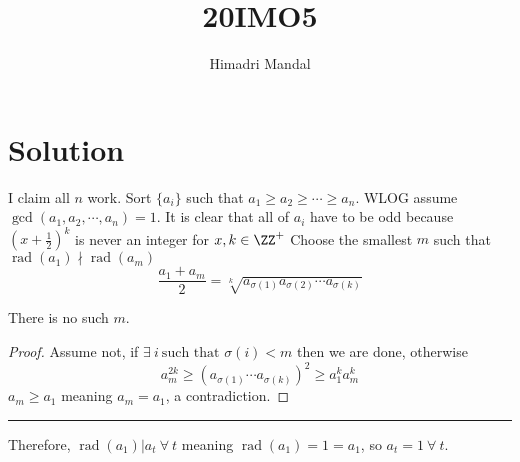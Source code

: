 \documentclass[11pt]{scrartcl}
\title{20IMO5}
\author{Himadri Mandal}
\begin{document}
\maketitle

\section{Solution}
\newcommand\rad{\operatorname{rad}}
\begin{soln}
  I claim all $n$ work. Sort $\{a_i\}$ such that $a_1 \geq a_2 \geq \cdots \geq a_n$. WLOG assume $\gcd(a_1,a_2,\cdots,a_n) = 1$. 
  It is clear that all of $a_i$ have to be odd because $(x+\frac12)^k$ 
  is never an integer for $x,k \in \ZZ^{+}$
  Choose the smallest $m$ such that $\rad(a_1) \nmid \rad(a_m)$
  \[ \frac{a_1 + a_m}{2} = \sqrt[k]{a_{\sigma(1)} a_{\sigma(2)} 
    \cdots a_{\sigma(k)}}\]
  \begin{claim*}
    There is no such $m$. 
  \end{claim*}
  \begin{proof}
    Assume not, if $\exists \ i \ \text{such that } \sigma(i) < m$ then we are done, otherwise  
    \[ a_m^{2k} \geq (a_{\sigma(1)}\cdots a_{\sigma(k)})^2 \geq a_1^k a_m^k\]
    $a_m \geq a_1$ meaning $a_m = a_1$, a contradiction.  
  \end{proof}
  \hrule

  \bigskip 
  Therefore, $\rad(a_1)|a_t \ \forall \ t$ meaning $\rad(a_1) = 1 = a_1$, so $a_t = 1 \ \forall \ t$. 
\end{soln}
\end{document}
